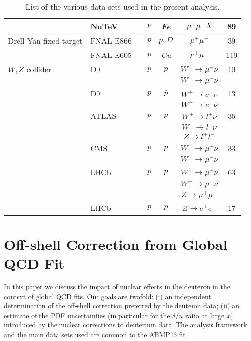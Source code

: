 \documentclass[%
      aps,
      prd,
      floatfix,
      preprintnumbers,
      preprint,
      showpacs,
      nofootinbib,
      tightenlines,
      amssymb,
      amsmath
]{revtex4-1}
\begin{document}
\begin{table}[ht]
\begin{center}
\begin{tabular}{l|l|c|c|c|c|c}
                  & NuTeV & \cite{Goncharov:2001qe} & $\nu$ & {\it Fe} & $\mu^+ \mu^- X$ & 89 \\ \hline  
Drell-Yan fixed target  & FNAL E866 & \cite{Towell:2001nh} & $p$ & $p,D$ & $\mu^+ \mu^-$ & 39 \\  
                        & FNAL E605 & \cite{Moreno:1990sf} & $p$ & {\it Cu} & $\mu^+ \mu^-$ & 119 \\ \hline 
$W,Z$ collider    & D0 & \cite{Abazov:2013rja} & $p$ & $\bar p$ & $W^+\to \mu^+\nu$  & 10 \\  
    &  &  &  &  & $W^-\to \mu^-\nu$  &  \\  
                  & D0 & \cite{D0:2014kma} & $p$ & $\bar p$ & $W^+\to e^+\nu$  & 13 \\ 
    &  &  &  &  & $W^-\to e^-\nu$  &  \\  
                  & ATLAS & \cite{Aad:2011dm,Aad:2016naf} & $p$ & $p$ & $W^+\to l^+\nu$  & 36 \\ 
    &  &  &  &  & $W^-\to l^-\nu$  &  \\  
    &  &  &  &  & $Z\to l^+l^-$  &  \\  
                  & CMS & \cite{Chatrchyan:2013mza,Khachatryan:2016pev} & $p$ & $p$ & $W^+\to \mu^+\nu$  & 33 \\ 
    &  &  &  &  & $W^-\to \mu^-\nu$  &  \\  
                  & LHCb & \cite{Aaij:2015gna,Aaij:2015zlq} & $p$ & $p$ & $W^+\to \mu^+\nu$  & 63 \\ 
    &  &  &  &  & $W^-\to \mu^-\nu$  &  \\  
    &  &  &  &  & $Z\to \mu^+\mu^-$  &  \\  
                  & LHCb & \cite{Aaij:2015vua} & $p$ & $p$ & $Z\to e^+e^-$  & 17 \\ \hline  
\end{tabular}
\end{center}
\caption{\label{tab:data}
List of the various data sets used in the present analysis. 
}
\end{table}



\section{Off-shell Correction from Global QCD Fit} 
\label{sec:fit}

In this paper we discuss the impact of nuclear effects in the deuteron in the context of global QCD fits. 
Our goals are twofold: (i) an independent determination of the off-shell correction preferred by 
the deuteron data; 
(ii) an estimate of the PDF uncertainties (in particular for the $d/u$ ratio at large $x$) introduced by the 
nuclear corrections to deuterium data.  
%
The analysis framework and the main data sets used are common to the ABMP16 fit~\cite{Alekhin:2017kpj}. 
\end{document}
